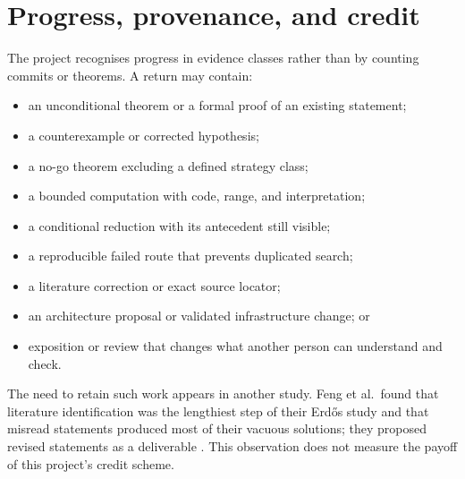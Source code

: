 \documentclass[10pt]{article}
\begin{document}
\section{Progress, provenance, and credit}\label{sec:credit}

The project recognises progress in evidence classes rather than by counting
commits or theorems.  A return may contain:

\begin{itemize}
\item an unconditional theorem or a formal proof of an existing statement;
\item a counterexample or corrected hypothesis;
\item a no-go theorem excluding a defined strategy class;
\item a bounded computation with code, range, and interpretation;
\item a conditional reduction with its antecedent still visible;
\item a reproducible failed route that prevents duplicated search;
\item a literature correction or exact source locator;
\item an architecture proposal or validated infrastructure change; or
\item exposition or review that changes what another person can understand
      and check.
\end{itemize}

The need to retain such work appears in another study. Feng et al.\ found
that literature identification was the lengthiest step of their Erd\H{o}s
study and that misread statements produced most of their vacuous solutions;
they proposed revised statements as a deliverable \cite{aletheia}. This
observation does not measure the payoff of this project's credit scheme.
\end{document}
